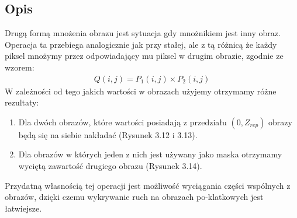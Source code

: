 \documentclass[a4paper,12pt]{book}
\begin{document}
\subsection{Opis}
Drugą formą mnożenia obrazu jest sytuacja gdy mnożnikiem jest inny obraz. Operacja ta przebiega analogicznie jak przy stałej, ale z tą różnicą że każdy piksel mnożymy przez odpowiadający mu piksel w drugim obrazie, zgodnie ze wzorem: 
\begin{gather}
	Q(i,j) = P_1(i,j) \times P_2(i,j)
\end{gather}
W zależności od tego jakich wartości w obrazach użyjemy otrzymamy różne rezultaty: 
\begin{enumerate}
	\item Dla dwóch obrazów, które wartości posiadają z przedziału $(0, Z_{rep})$ obrazy będą się na siebie nakładać (Rysunek 3.12 i 3.13). 
	\item Dla obrazów w których jeden z nich jest używany jako maska otrzymamy wyciętą zawartość drugiego obrazu (Rysunek 3.14). 
\end{enumerate}
Przydatną własnością tej operacji jest możliwość wyciągania części wspólnych z obrazów, dzięki czemu wykrywanie ruch na obrazach po-klatkowych jest łatwiejsze. 
\end{document}
